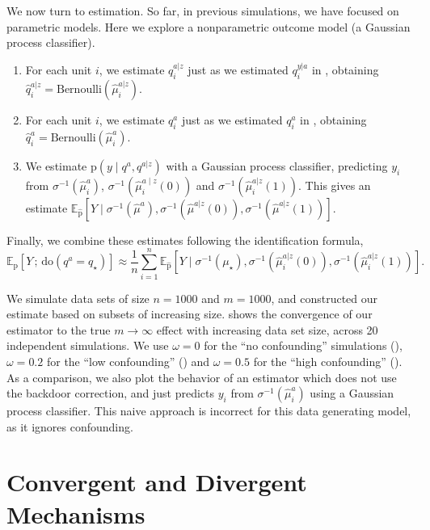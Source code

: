 \documentclass[12pt]{article}
\newcommand{\rmdo}{\mathrm{do}}
\newcommand{\s}{\, ; \,}
\newcommand{\pr}{\mathrm{p}}
\begin{document}
We now turn to estimation.
So far, in previous simulations, we have focused on parametric models. Here we explore a nonparametric outcome model (a Gaussian process classifier).
\begin{enumerate}[leftmargin=*]
\item For each unit $i$, we estimate $q_i^{a| z}$ just as we estimated $q_i^{y | a}$ in , obtaining $\hat{q}_i^{a |z} = \mathrm{Bernoulli}(\hat{\mu}_i^{a|z})$.
\item For each unit $i$, we estimate $q_i^{a}$ just as we estimated $q_i^{a}$ in , obtaining $\hat{q}_i^{a} = \mathrm{Bernoulli}(\hat{\mu}_i^{a})$.
\item We estimate $\pr(y \mid q^{a}, q^{a |z})$ with a Gaussian process classifier, predicting $y_i$ from $\sigma^{-1}(\hat{\mu}^{a}_i)$, $\sigma^{-1}(\hat{\mu}^{a \mid z}_i(0))$ and $\sigma^{-1}(\hat{\mu}^{a |z }_i(1))$. 
This gives an estimate $\mathbb{E}_{\hat{\pr}}[Y \mid \sigma^{-1}(\hat{\mu}^{a}), \sigma^{-1}(\hat{\mu}^{a|z}(0)), \sigma^{-1}(\hat{\mu}^{a|z}(1))]$.
\end{enumerate}
Finally, we combine these estimates following the identification formula,
\begin{equation*}
        \mathbb{E}_\pr[Y \s \rmdo(q^{a} = q_\star)] \approx \frac{1}{n} \sum_{i=1}^n\mathbb{E}_{\hat{\pr}}[Y \mid \sigma^{-1}(\mu_{\star}), \sigma^{-1}(\hat{\mu}_i^{a|z}(0)), \sigma^{-1}(\hat{\mu}_i^{a|z}(1))].
\end{equation*}


We simulate data sets of size $n = 1000$ and $m = 1000$, and constructed our estimate based on subsets of increasing size.
 shows the convergence of our estimator to the true $m \to \infty$ effect with increasing data set size, across 20 independent simulations.
We use $\omega=0$ for the ``no confounding'' simulations (), $\omega=0.2$ for the ``low confounding'' () and $\omega=0.5$ for the ``high confounding'' ().
As a comparison, we also plot the behavior of an estimator which does not use the backdoor correction, and just predicts $y_i$ from  $\sigma^{-1}(\hat{\mu}^{a}_i)$ using a Gaussian process classifier.
This naive approach is incorrect for this data generating model, as it ignores confounding. 
\section{Convergent and Divergent Mechanisms} \label{sec:exp-family-mechanisms}
\end{document}
